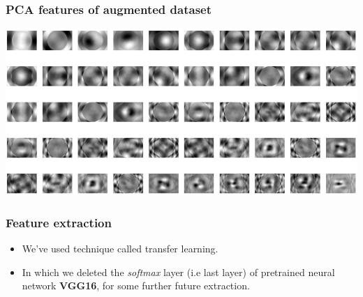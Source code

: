 \documentclass[aspectratio=169]{beamer}
\begin{document}
\begin{frame}
  \frametitle{PCA features of augmented dataset}
\centering
\includegraphics[height=0.7\textheight]{images/augmentedpca.png}
\end{frame}


\begin{frame}
    \frametitle{Feature extraction}
    \begin{itemize}
        \item We've used technique called transfer learning. 
        \item In which we deleted the \textit{softmax}  layer (i.e last layer) of pretrained neural network \textbf{VGG16}, for some further future extraction.
        
    \end{itemize}

\end{frame}
\end{document}
